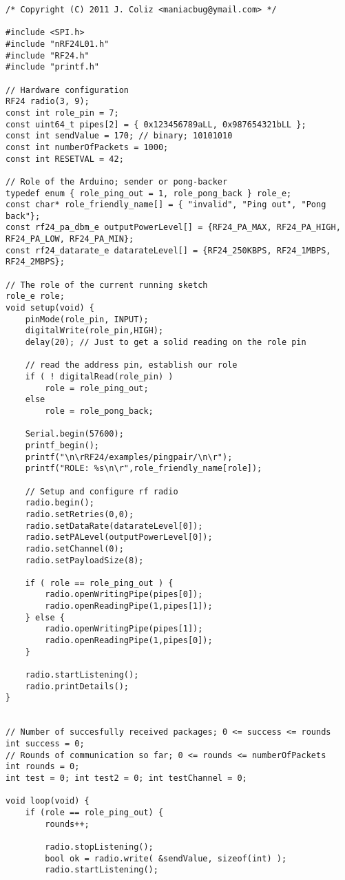 \begin{lstlisting}
/* Copyright (C) 2011 J. Coliz <maniacbug@ymail.com> */

#include <SPI.h>
#include "nRF24L01.h"
#include "RF24.h"
#include "printf.h"

// Hardware configuration
RF24 radio(3, 9);
const int role_pin = 7;
const uint64_t pipes[2] = { 0x123456789aLL, 0x987654321bLL };
const int sendValue = 170; // binary; 10101010
const int numberOfPackets = 1000;
const int RESETVAL = 42;

// Role of the Arduino; sender or pong-backer
typedef enum { role_ping_out = 1, role_pong_back } role_e;
const char* role_friendly_name[] = { "invalid", "Ping out", "Pong back"};
const rf24_pa_dbm_e outputPowerLevel[] = {RF24_PA_MAX, RF24_PA_HIGH, RF24_PA_LOW, RF24_PA_MIN};
const rf24_datarate_e datarateLevel[] = {RF24_250KBPS, RF24_1MBPS, RF24_2MBPS};

// The role of the current running sketch
role_e role;
void setup(void) {
    pinMode(role_pin, INPUT);
    digitalWrite(role_pin,HIGH);
    delay(20); // Just to get a solid reading on the role pin

    // read the address pin, establish our role
    if ( ! digitalRead(role_pin) )
        role = role_ping_out;
    else
        role = role_pong_back;

    Serial.begin(57600);
    printf_begin();
    printf("\n\rRF24/examples/pingpair/\n\r");
    printf("ROLE: %s\n\r",role_friendly_name[role]);

    // Setup and configure rf radio
    radio.begin();
    radio.setRetries(0,0);
    radio.setDataRate(datarateLevel[0]);
    radio.setPALevel(outputPowerLevel[0]);
    radio.setChannel(0);
    radio.setPayloadSize(8);

    if ( role == role_ping_out ) {
        radio.openWritingPipe(pipes[0]);
        radio.openReadingPipe(1,pipes[1]);
    } else {
        radio.openWritingPipe(pipes[1]);
        radio.openReadingPipe(1,pipes[0]);
    }

    radio.startListening();
    radio.printDetails();
}


// Number of succesfully received packages; 0 <= success <= rounds
int success = 0;
// Rounds of communication so far; 0 <= rounds <= numberOfPackets
int rounds = 0;
int test = 0; int test2 = 0; int testChannel = 0;

void loop(void) {
    if (role == role_ping_out) {
        rounds++;

        radio.stopListening();
        bool ok = radio.write( &sendValue, sizeof(int) );
        radio.startListening();


\end{lstlisting}

